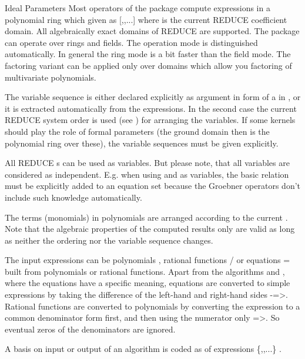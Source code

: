 \begin{Concept}{Ideal Parameters}
Most operators of the  package compute expressions in a
polynomial ring which given as [,,...] where
 is the current REDUCE coefficient domain.  All algebraically
exact domains of REDUCE are supported.  The package can operate over rings
and fields.  The operation mode is distinguished automatically.  In
general the ring mode is a bit faster than the field mode.  The factoring
variant can be applied only over domains which allow you factoring of
multivariate polynomials.

The variable sequence  is either declared explicitly as argument
in form of a  in , or it is extracted
automatically from the expressions.  In the second case the current REDUCE
system order is used (see ) for arranging the variables.
If some kernels should play the role of formal parameters (the ground
domain  then is the polynomial ring over these), the variable
sequences must be given explicitly.

All REDUCE s can be used as variables.  But please note,
that all variables are considered as independent.  E.g. when using
 and  as variables, the basic relation
 must be explicitly added to an equation set
because the Groebner operators don't include such knowledge automatically.

The terms (monomials) in polynomials are arranged according to the current
.  Note that the algebraic properties of the computed
results only are valid as long as neither the ordering nor the variable
sequence changes.

The input expressions  can be polynomials , rational
functions / or equations = built from
polynomials or rational functions.  Apart from the 
algorithms  and , where the equations
have a specific meaning, equations are converted to simple expressions by
taking the difference of the left-hand and right-hand sides
-=>.  Rational functions are converted to
polynomials by converting the expression to a common denominator form
first, and then using the numerator only =>.  So eventual
zeros of the denominators are ignored.

A basis on input or output of an algorithm is coded as  of
expressions \{,,...\} . \end{Concept}

